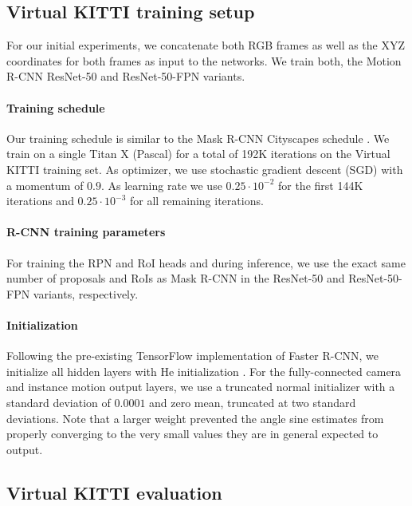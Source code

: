 \subsection{Virtual KITTI training setup}
\label{ssec:setup}

For our initial experiments, we concatenate both RGB frames as
well as the XYZ coordinates for both frames as input to the networks.
We train both, the Motion R-CNN ResNet-50 and ResNet-50-FPN variants.

\paragraph{Training schedule}
Our training schedule is similar to the Mask R-CNN Cityscapes schedule \cite{MaskRCNN}.
We train on a single Titan X (Pascal) for a total of 192K iterations on the
Virtual KITTI training set.
As optimizer, we use stochastic gradient descent (SGD) \cite{SGD} with a
momentum of $0.9$.
As learning rate we use $0.25 \cdot 10^{-2}$ for the
first 144K iterations and $0.25 \cdot 10^{-3}$ for all remaining iterations.

\paragraph{R-CNN training parameters}
For training the RPN and RoI heads and during inference,
we use the exact same number of proposals and RoIs as Mask R-CNN in
the ResNet-50 and ResNet-50-FPN variants, respectively.

\paragraph{Initialization}
Following the pre-existing TensorFlow implementation of Faster R-CNN,
we initialize all hidden layers with He initialization \cite{He}.
For the fully-connected camera and instance motion output layers,
we use a truncated normal initializer with a standard
deviation of $0.0001$ and zero mean, truncated at two standard deviations.
Note that a larger weight prevented the
angle sine estimates from properly converging to the very small values they
are in general expected to output.

\subsection{Virtual KITTI evaluation}
\label{ssec:vkitti}

